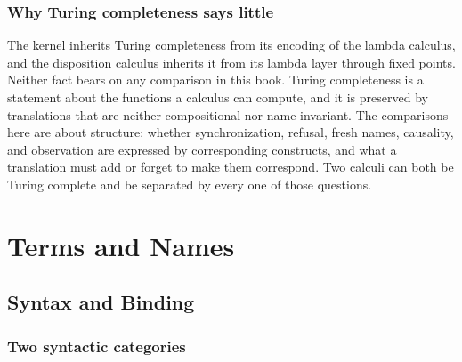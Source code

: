 \documentclass[11pt,openany]{book}
\theoremstyle{remark}
\begin{document}
\section{Why Turing completeness says little}

The kernel inherits Turing completeness from its encoding of the lambda
calculus, and the disposition calculus inherits it from its lambda layer
through fixed points. Neither fact bears on any comparison in this book.
Turing completeness is a statement about the functions a calculus can
compute, and it is preserved by translations that are neither
compositional nor name invariant. The comparisons here are about
structure: whether synchronization, refusal, fresh names, causality, and
observation are expressed by corresponding constructs, and what a
translation must add or forget to make them correspond. Two calculi can
both be Turing complete and be separated by every one of those questions.

\part{Terms and Names}

\chapter{Syntax and Binding}
\label{ch:syntax}

\section{Two syntactic categories}
\end{document}
